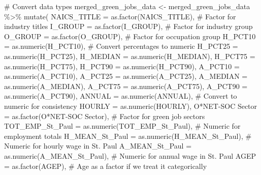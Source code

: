 \documentclass[
  letterpaper,
  DIV=11,
  numbers=noendperiod]{scrartcl}
\newenvironment{Shaded}{\begin{snugshade}}{\end{snugshade}}
\newcommand{\AttributeTok}[1]{\textcolor[rgb]{0.40,0.45,0.13}{#1}}
\newcommand{\CommentTok}[1]{\textcolor[rgb]{0.37,0.37,0.37}{#1}}
\newcommand{\FunctionTok}[1]{\textcolor[rgb]{0.28,0.35,0.67}{#1}}
\newcommand{\NormalTok}[1]{\textcolor[rgb]{0.00,0.23,0.31}{#1}}
\newcommand{\OtherTok}[1]{\textcolor[rgb]{0.00,0.23,0.31}{#1}}
\newcommand{\SpecialCharTok}[1]{\textcolor[rgb]{0.37,0.37,0.37}{#1}}
\newcommand{\StringTok}[1]{\textcolor[rgb]{0.13,0.47,0.30}{#1}}
\begin{document}
\begin{Shaded}
\begin{Highlighting}[]
\CommentTok{\# Convert data types}
\NormalTok{merged\_green\_jobs\_data }\OtherTok{\textless{}{-}}\NormalTok{ merged\_green\_jobs\_data }\SpecialCharTok{\%\textgreater{}\%}
  \FunctionTok{mutate}\NormalTok{(}
    \AttributeTok{NAICS\_TITLE =} \FunctionTok{as.factor}\NormalTok{(NAICS\_TITLE),  }\CommentTok{\# Factor for industry titles}
    \AttributeTok{I\_GROUP =} \FunctionTok{as.factor}\NormalTok{(I\_GROUP),  }\CommentTok{\# Factor for industry group}
    \AttributeTok{O\_GROUP =} \FunctionTok{as.factor}\NormalTok{(O\_GROUP),  }\CommentTok{\# Factor for occupation group}
    \AttributeTok{H\_PCT10 =} \FunctionTok{as.numeric}\NormalTok{(H\_PCT10),  }\CommentTok{\# Convert percentages to numeric}
    \AttributeTok{H\_PCT25 =} \FunctionTok{as.numeric}\NormalTok{(H\_PCT25),}
    \AttributeTok{H\_MEDIAN =} \FunctionTok{as.numeric}\NormalTok{(H\_MEDIAN),}
    \AttributeTok{H\_PCT75 =} \FunctionTok{as.numeric}\NormalTok{(H\_PCT75),}
    \AttributeTok{H\_PCT90 =} \FunctionTok{as.numeric}\NormalTok{(H\_PCT90),}
    \AttributeTok{A\_PCT10 =} \FunctionTok{as.numeric}\NormalTok{(A\_PCT10),}
    \AttributeTok{A\_PCT25 =} \FunctionTok{as.numeric}\NormalTok{(A\_PCT25),}
    \AttributeTok{A\_MEDIAN =} \FunctionTok{as.numeric}\NormalTok{(A\_MEDIAN),}
    \AttributeTok{A\_PCT75 =} \FunctionTok{as.numeric}\NormalTok{(A\_PCT75),}
    \AttributeTok{A\_PCT90 =} \FunctionTok{as.numeric}\NormalTok{(A\_PCT90),}
    \AttributeTok{ANNUAL =} \FunctionTok{as.numeric}\NormalTok{(ANNUAL),  }\CommentTok{\# Convert to numeric for consistency}
    \AttributeTok{HOURLY =} \FunctionTok{as.numeric}\NormalTok{(HOURLY),}
    \StringTok{\textasciigrave{}}\AttributeTok{O*NET{-}SOC Sector}\StringTok{\textasciigrave{}} \OtherTok{=} \FunctionTok{as.factor}\NormalTok{(}\StringTok{\textasciigrave{}}\AttributeTok{O*NET{-}SOC Sector}\StringTok{\textasciigrave{}}\NormalTok{),  }\CommentTok{\# Factor for green job sectors}
    \AttributeTok{TOT\_EMP\_St\_Paul =} \FunctionTok{as.numeric}\NormalTok{(TOT\_EMP\_St\_Paul),  }\CommentTok{\# Numeric for employment totals}
    \AttributeTok{H\_MEAN\_St\_Paul =} \FunctionTok{as.numeric}\NormalTok{(H\_MEAN\_St\_Paul),  }\CommentTok{\# Numeric for hourly wage in St. Paul}
    \AttributeTok{A\_MEAN\_St\_Paul =} \FunctionTok{as.numeric}\NormalTok{(A\_MEAN\_St\_Paul),  }\CommentTok{\# Numeric for annual wage in St. Paul}
    \AttributeTok{AGEP =} \FunctionTok{as.factor}\NormalTok{(AGEP),  }\CommentTok{\# Age as a factor if we treat it categorically}

\end{Highlighting}
\end{Shaded}
\end{document}

